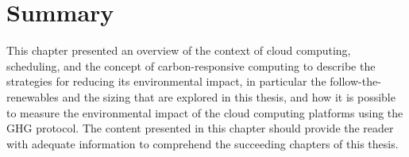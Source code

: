 \section{Summary}

This chapter presented an overview of the context of cloud computing, scheduling, and the concept of carbon-responsive computing to describe the strategies for reducing its environmental impact, in particular the follow-the-renewables and the sizing that are explored in this thesis, and how it is possible to measure the environmental impact of the cloud computing platforms using the GHG protocol. The content presented in this chapter should provide the reader with adequate information to comprehend the succeeding chapters of this thesis.
